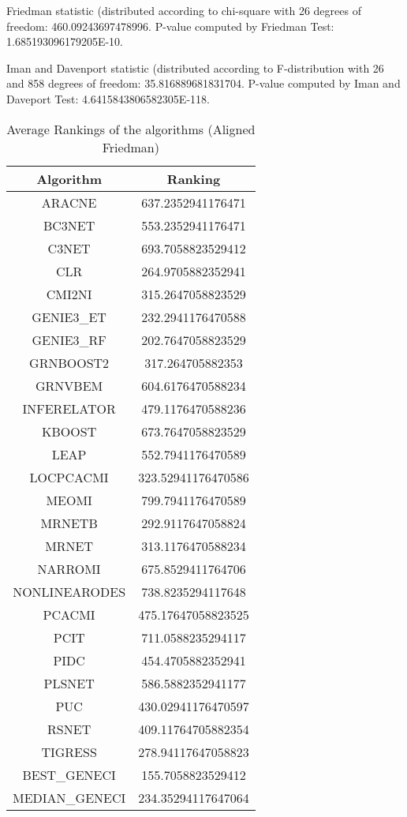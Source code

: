 \documentclass[a4paper,10pt]{article}
\begin{document}
\begin{landscape}
Friedman statistic (distributed according to chi-square with 26 degrees of freedom: 460.09243697478996. 
P-value computed by Friedman Test: 1.685193096179205E-10.\newline

Iman and Davenport statistic (distributed according to F-distribution with 26 and 858 degrees of freedom: 35.816889681831704. 
P-value computed by Iman and Daveport Test: 4.6415843806582305E-118.\newline


\newpage

\begin{table}[!htp]
\centering
\caption{Average Rankings of the algorithms (Aligned Friedman)
}\begin{tabular}{c|c}
Algorithm&Ranking\\
\hline
ARACNE&637.2352941176471\\
BC3NET&553.2352941176471\\
C3NET&693.7058823529412\\
CLR&264.9705882352941\\
CMI2NI&315.2647058823529\\
GENIE3_ET&232.2941176470588\\
GENIE3_RF&202.7647058823529\\
GRNBOOST2&317.264705882353\\
GRNVBEM&604.6176470588234\\
INFERELATOR&479.1176470588236\\
KBOOST&673.7647058823529\\
LEAP&552.7941176470589\\
LOCPCACMI&323.52941176470586\\
MEOMI&799.7941176470589\\
MRNETB&292.9117647058824\\
MRNET&313.1176470588234\\
NARROMI&675.8529411764706\\
NONLINEARODES&738.8235294117648\\
PCACMI&475.17647058823525\\
PCIT&711.0588235294117\\
PIDC&454.4705882352941\\
PLSNET&586.5882352941177\\
PUC&430.02941176470597\\
RSNET&409.11764705882354\\
TIGRESS&278.94117647058823\\
BEST_GENECI&155.7058823529412\\
MEDIAN_GENECI&234.35294117647064\\
\end{tabular}
\end{table}



\end{landscape}
\end{document}
